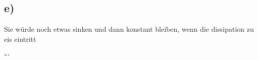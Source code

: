 

\subsection*{e)}
Sie würde noch etwas sinken und dann konstant bleiben, wenn die  dissipation zu eis eintritt

```